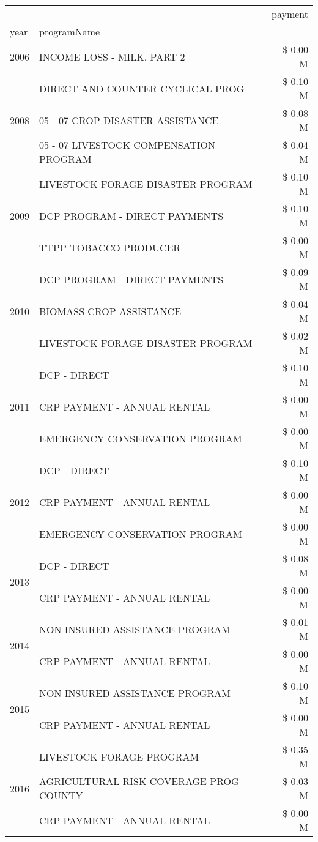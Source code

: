 \begin{tabular}{llr}
\toprule
 &  & payment \\
year & programName &  \\
\midrule
2006 & INCOME LOSS - MILK, PART 2 & \$ 0.00 M \\
\cline{1-3}
\multirow[t]{3}{*}{2008} & DIRECT AND COUNTER CYCLICAL PROG & \$ 0.10 M \\
 & 05 - 07 CROP DISASTER ASSISTANCE & \$ 0.08 M \\
 & 05 - 07 LIVESTOCK COMPENSATION PROGRAM & \$ 0.04 M \\
\cline{1-3}
\multirow[t]{3}{*}{2009} & LIVESTOCK FORAGE DISASTER  PROGRAM & \$ 0.10 M \\
 & DCP PROGRAM - DIRECT PAYMENTS & \$ 0.10 M \\
 & TTPP TOBACCO PRODUCER & \$ 0.00 M \\
\cline{1-3}
\multirow[t]{3}{*}{2010} & DCP PROGRAM - DIRECT PAYMENTS & \$ 0.09 M \\
 & BIOMASS CROP ASSISTANCE & \$ 0.04 M \\
 & LIVESTOCK FORAGE DISASTER  PROGRAM & \$ 0.02 M \\
\cline{1-3}
\multirow[t]{3}{*}{2011} & DCP - DIRECT & \$ 0.10 M \\
 & CRP PAYMENT - ANNUAL RENTAL & \$ 0.00 M \\
 & EMERGENCY CONSERVATION PROGRAM & \$ 0.00 M \\
\cline{1-3}
\multirow[t]{3}{*}{2012} & DCP - DIRECT & \$ 0.10 M \\
 & CRP PAYMENT - ANNUAL RENTAL & \$ 0.00 M \\
 & EMERGENCY CONSERVATION PROGRAM & \$ 0.00 M \\
\cline{1-3}
\multirow[t]{2}{*}{2013} & DCP - DIRECT & \$ 0.08 M \\
 & CRP PAYMENT - ANNUAL RENTAL & \$ 0.00 M \\
\cline{1-3}
\multirow[t]{2}{*}{2014} & NON-INSURED ASSISTANCE PROGRAM & \$ 0.01 M \\
 & CRP PAYMENT - ANNUAL RENTAL & \$ 0.00 M \\
\cline{1-3}
\multirow[t]{2}{*}{2015} & NON-INSURED ASSISTANCE PROGRAM & \$ 0.10 M \\
 & CRP PAYMENT - ANNUAL RENTAL & \$ 0.00 M \\
\cline{1-3}
\multirow[t]{3}{*}{2016} & LIVESTOCK FORAGE PROGRAM & \$ 0.35 M \\
 & AGRICULTURAL RISK COVERAGE PROG - COUNTY & \$ 0.03 M \\
 & CRP PAYMENT - ANNUAL RENTAL & \$ 0.00 M \\

\end{tabular}
